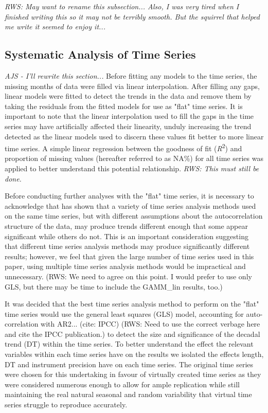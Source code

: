 \documentclass{ametsoc}
\begin{document}
\emph{RWS: May want to rename this subsection... Also, I was very tired when I finished writing this so it may not be terribly smooth. But the squirrel that helped me write it seemed to enjoy it...}

\subsection{Systematic Analysis of Time Series}
\emph{AJS - I'll rewrite this section...}
Before fitting any models to the time series, the missing months of data were filled via linear interpolation. After filling any gaps, linear models were fitted to detect the trends in the data and remove them by taking the residuals from the fitted models for use as "flat" time series. It is important to note that the linear interpolation used to fill the gaps in the time series may have artificially affected their linearity, unduly increasing the trend detected as the linear models used to discern these values fit better to more linear time series. A simple linear regression between the goodness of fit (\emph{R}\textsuperscript{2}) and proportion of missing values (hereafter referred to as NA\%) for all time series was applied to better understand this potential relationship. \emph{RWS: This must still be done.}

Before conducting further analyses with the "flat" time series, it is necessary to acknowledge that \citet{Franzke2012} has shown that a variety of time series analysis methods used on the same time series, but with different assumptions about the autocorrelation structure of the data, may produce trends different enough that some appear significant while others do not. This is an important consideration suggesting that different time series analysis methods may produce significantly different results; however, we feel that given the large number of time series used in this paper, using multiple time series analysis methods would be impractical and unnecessary. (RWS: We need to agree on this point. I would prefer to use only GLS, but there may be time to include the GAMM_lin results, too.)

It was decided that the best time series analysis method to perform on the "flat" time series would use the general least squares (GLS) model, accounting for auto-correlation with AR2... (cite: IPCC) (RWS: Need to use the correct verbage here and cite the IPCC publication.) to detect the size and significance of the decadal trend (DT) within the time series. To better understand the effect the relevant variables within each time series have on the results we isolated the effects length, DT and instrument precision have on each time series. The original time series were chosen for this undertaking in favour of virtually created time series as they were considered numerous enough to allow for ample replication while still maintaining the real natural seasonal and random variability that virtual time series struggle to reproduce accurately.
\end{document}

